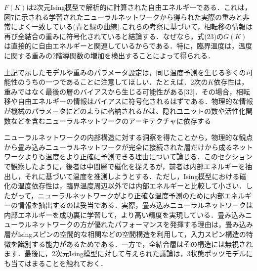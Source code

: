 \documentclass[a4paper,11pt]{jsarticle}
\begin{document}
$F(K)$は2次元Ising模型で解析的に計算された自由エネルギーである．これは，図7に示される学習されたニューラルネットワークから得られた実際の重みと非常によく一致している(青と緑の曲線).これらの考察に基づいて，相転移の情報は再び全結合の重みに符号化されていると結論する．なぜなら，式(23)の$G(K)$は直接的に自由エネルギーと関連しているからである．特に，臨界温度は，温度に関する重みの2階導関数の増加を検出することによって得られる．\par
上記で示したモデルや重みのパラメータ設定は，同じ温度予測を生じる多くの可能性のうちの一つであることに注意してほしい．たとえば．2次の$K$依存性は，重みではなく最後の層のバイアスから生じる可能性がある[32]．その場合，相転移や自由エネルギーの情報はバイアスに符号化されるはずである．物理的な情報が機械のパラメータにどのように格納されるかは、隠れユニットの数や活性化関数などを含むニューラルネットワークのアーキテクチャに依存する\par
ニューラルネットワークの内部構造に対する洞察を得たことから，物理的な観点から畳み込みニューラルネットワークが完全に接続された層だけから成るネットワークよりも温度をより正確に予測できる理由について論じる．このセクションで観察したように，後者は中間層で磁化を捉えるが，前者は内部エネルギーを抽出し，それに基づいて温度を推測しようとする．ただし，Ising模型における磁化の温度依存性は，臨界温度周辺以外では内部エネルギーと比較して小さい．したがって，ニューラルネットワークがより正確な温度予測のために内部エネルギーの情報を抽出するのは妥当である．実際，畳み込みニューラルネットワークは内部エネルギーを成功裏に学習して，より高い精度を実現している．畳み込みニューラルネットワークの方が優れたパフォーマンスを発揮する理由は，畳み込み層がIsingスピンの空間的な相関などの空間構造を利用して，入力スピン構造の特徴を識別する能力があるためである．一方で，全結合層はその構造には無視されます．最後に，2次元Ising模型に対して与えられた議論は，3状態ポッツモデルにも当てはまることを触れておく．\par
\end{document}
